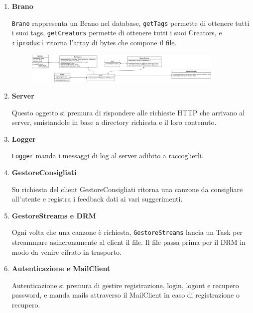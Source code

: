 \documentclass[a4paper,12pt]{article}
\begin{document}
\begin{enumerate}
    \item \label{brano} \textbf{Brano}

    \texttt{Brano} rappresenta un Brano nel database, \texttt{getTags} permette di ottenere tutti i suoi tags, \texttt{getCreators} permette di ottenere tutti i suoi Creators, e \texttt{riproduci} ritorna l'array di bytes che compone il file.

    \newpage

    \begin{figure}[htp]
        \centering
        \includegraphics[width=0.9\textwidth]{diagrams/class-server.png}
    \end{figure}

    \item \label{server} \textbf{Server}

    Questo oggetto si premura di rispondere alle richieste HTTP che arrivano al server, smistandole in base a directory richiesta e il loro contenuto.

    \item \label{logger} \textbf{Logger}

    \texttt{Logger} manda i messaggi di log al server adibito a raccoglierli.

    \item \label{consigliati} \textbf{GestoreConsigliati}

    Su richiesta del client GestoreConsigliati ritorna una canzone da consigliare all'utente e registra i feedback dati ai vari suggerimenti.

    \item \label{streams} \textbf{GestoreStreams e DRM}

    Ogni volta che una canzone è richiesta, \texttt{GestoreStreams} lancia un Task per streammare asincronamente al client il file. Il file passa prima per il DRM in modo da venire cifrato in trasporto.

    \item \label{auth} \textbf{Autenticazione e MailClient}

    Autenticazione si premura di gestire registrazione, login, logout e recupero password, e manda mails attraverso il MailClient in caso di registrazione o recupero.

    \newpage


\end{enumerate}
\end{document}
